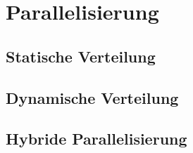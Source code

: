 \section{Parallelisierung}

\subsection{Statische Verteilung}

\subsection{Dynamische Verteilung}

\subsection{Hybride Parallelisierung}
